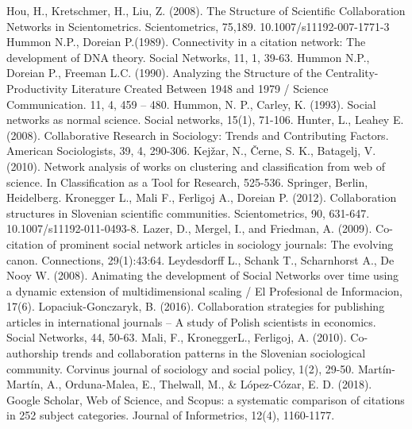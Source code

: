 \documentclass[11pt]{article} %
\begin{document}
\begin{thebibliography}{99}
   Hou, H., Kretschmer, H., Liu, Z. (2008). The Structure of Scientific Collaboration Networks in Scientometrics. Scientometrics, 75,189. 10.1007/s11192-007-1771-3 
   Hummon N.P., Doreian P.(1989). Connectivity in a citation network: The development of DNA theory. Social Networks, 11, 1, 39-63. 
   Hummon N.P., Doreian P., Freeman L.C. (1990). Analyzing the Structure of the Centrality-Productivity Literature Created Between 1948 and 1979 / Science Communication. 11, 4, 459 – 480. 
   Hummon, N. P., Carley, K. (1993). Social networks as normal science. Social networks, 15(1), 71-106.
   Hunter, L., Leahey E. (2008). Collaborative Research in Sociology: Trends and Contributing Factors. American Sociologists, 39, 4, 290-306. 
Kejžar, N., Černe, S. K., Batagelj, V. (2010). Network analysis of works on clustering and classification from web of science. In Classification as a Tool for Research, 525-536. Springer, Berlin, Heidelberg.
   Kronegger L., Mali F., Ferligoj A., Doreian P. (2012). Collaboration structures in Slovenian scientific communities. Scientometrics, 90, 631-647. 10.1007/s11192-011-0493-8. 
   Lazer, D., Mergel, I., and Friedman, A. (2009). Co-citation of prominent social network articles in sociology journals: The evolving canon. Connections, 29(1):43:64. 
   Leydesdorff L., Schank T., Scharnhorst A., De Nooy W. (2008). Animating the development of Social Networks over time using a dynamic extension of multidimensional scaling / El Profesional de Informacion, 17(6).
   Lopaciuk-Gonczaryk, B. (2016). Collaboration strategies for publishing articles in international journals – A study of Polish scientists in economics. Social Networks, 44, 50-63.   
   Mali, F., KroneggerL., Ferligoj, A. (2010). Co-authorship trends and collaboration patterns in the Slovenian sociological community. Corvinus journal of sociology and social policy, 1(2), 29-50.
Martín-Martín, A., Orduna-Malea, E., Thelwall, M., \& López-Cózar, E. D. (2018). Google Scholar, Web of Science, and Scopus: a systematic comparison of citations in 252 subject categories. Journal of Informetrics, 12(4), 1160-1177.

\end{thebibliography}
\end{document}

